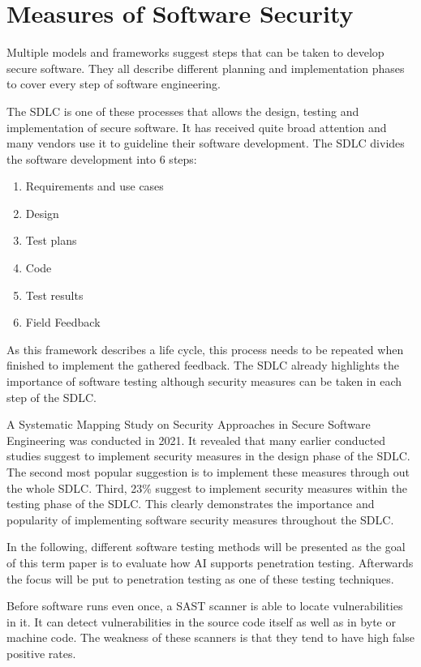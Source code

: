 \chapter{Measures of Software Security}
\label{ch:software_security}
Multiple models and frameworks suggest steps that can be taken to develop secure software. They all describe different planning and implementation phases to cover every step of software engineering. \cite{Khan_2021}

The \ac{SDLC} is one of these processes that allows the design, testing and implementation of secure software. It has received quite broad attention and many vendors use it to guideline their software development. The \ac{SDLC} divides the software development into 6 steps:
\begin{enumerate}
    \item Requirements and use cases
    \item Design
    \item Test plans
    \item Code
    \item Test results
    \item Field Feedback
\end{enumerate}
As this framework describes a life cycle, this process needs to be repeated when finished to implement the gathered feedback. The \ac{SDLC} already highlights the importance of software testing although security measures can be taken in each step of the \ac{SDLC}. \cite{McGraw_2004}

A Systematic Mapping Study on Security Approaches in Secure Software Engineering was conducted in 2021. It revealed that many earlier conducted studies suggest to implement security measures in the design phase of the \ac{SDLC}. The second most popular suggestion is to implement these measures through out the whole \ac{SDLC}. Third, 23\% suggest to implement security measures within the testing phase of the \ac{SDLC}. \cite{Khan_2021} This clearly demonstrates the importance and popularity of implementing software security measures throughout the \ac{SDLC}.

In the following, different software testing methods will be presented as the goal of this term paper is to evaluate how AI supports penetration testing. Afterwards the focus will be put to penetration testing as one of these testing techniques.

Before software runs even once, a \ac{SAST} scanner is able to locate vulnerabilities in it. It can detect vulnerabilities in the source code itself as well as in byte or machine code. The weakness of these scanners is that they tend to have high false positive rates. \cite{Dalaq_2025}

